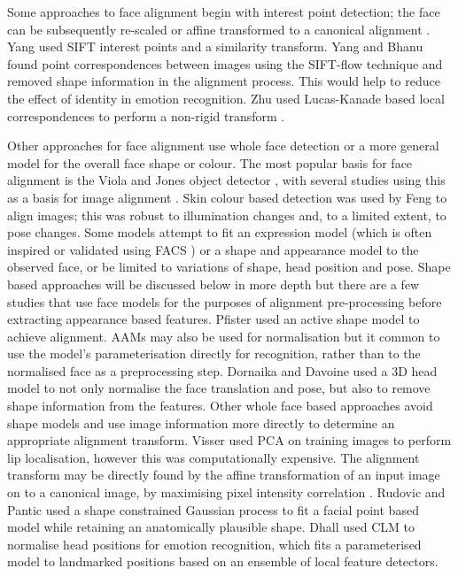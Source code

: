 Some approaches to face alignment begin with interest point detection; the face can be subsequently re-scaled or affine transformed to a canonical alignment \cite{Zhu2009b}. Yang \etal \cite{Yang2009b} used SIFT interest points and a similarity transform. Yang and Bhanu \cite{Yang2011} found point correspondences between images using the SIFT-flow technique and removed shape information in the alignment process. This would help to reduce the effect of identity in emotion recognition. Zhu \etal used Lucas-Kanade based local correspondences to perform a non-rigid transform \cite{Zhu2009b}.

Other approaches for face alignment use whole face detection or a more general model for the overall face shape or colour. The most popular basis for face alignment is the Viola and Jones object detector \cite{Viola2002}, with several studies using this as a basis for image alignment \cite{Kanluan2008, Bartlett2006, Moore07}. Skin colour based detection was used by Feng \etal \cite{Feng2005} to align images; this was robust to illumination changes and, to a limited extent, to pose changes. Some models attempt to fit an expression model (which is often inspired or validated using \ac{FACS} \cite{Cosker2010, Ahlberg2001}) or a shape and appearance model to the observed face, or be limited to variations of shape, head position and pose. Shape based approaches will be discussed below in more depth but there are a few studies that use face models for the purposes of alignment pre-processing before extracting appearance based features. Pfister \etal \cite{Pfister2011} used an active shape model to achieve alignment. \ac{AAM}s may also be used for normalisation \cite{Lan2009} but it common to use the model's parameterisation directly for recognition, rather than to the normalised face as a preprocessing step. Dornaika and Davoine \cite{Dornaika2005} used a 3{D} head model to not only normalise the face translation and pose, but also to remove shape information from the features. Other whole face based approaches avoid shape models and use image information more directly to determine an appropriate alignment transform. Visser \etal \cite{Visser1999} used \ac{PCA} on training images to perform lip localisation, however this was computationally expensive. The alignment transform may be directly found by the affine transformation of an input image on to a canonical image, by maximising pixel intensity correlation \cite{Tzimiropoulos2011}. Rudovic and Pantic \cite{Rudovic2011} used a shape constrained Gaussian process to fit a facial point based model while retaining an anatomically plausible shape. Dhall \cite{Dhall2011} \etal used \ac{CLM} to normalise head positions for emotion recognition, which fits a parameterised model to landmarked positions based on an ensemble of local feature detectors.

